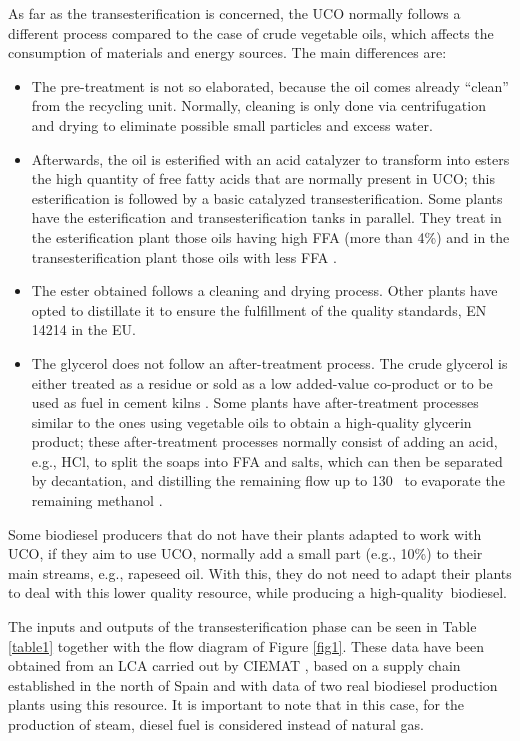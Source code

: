 \documentclass[sustainability,article,accept,moreauthors,pdftex,12pt,a4paper]{mdpi}
\newcommand{\degreeC}[1]{#1~\textcelsius}
\begin{document}
As far as the transesterification is concerned, the UCO normally follows a different process compared to the case of crude vegetable oils, which affects the consumption of materials and energy sources. The main differences are:
\begin{itemize}
\vspace{6pt}
\item The pre-treatment is not so elaborated, because the oil comes already ``clean'' from the recycling unit. Normally, cleaning is only done via centrifugation and drying to eliminate possible small particles and excess water.
\item Afterwards, the oil is esterified with an acid catalyzer to transform into esters the high quantity of free fatty acids that are normally present in UCO; this esterification is followed by a basic catalyzed transesterification. Some plants have the esterification and transesterification tanks in parallel. They treat in the esterification plant those oils having high FFA (more than 4\%) and in the transesterification plant those oils with less FFA \cite{CIEMAT2005}.
\item The ester obtained follows a cleaning and drying process. Other plants have opted to distillate it to ensure the fulfillment of the quality standards, EN 14214 \cite{CENEN14214} in the EU.
\item The glycerol does not follow an after-treatment process. The crude glycerol is either treated as a residue or sold as a low added-value co-product or to be used as fuel in cement kilns \cite{FontdeMoraThesis2013}. Some plants have after-treatment processes similar to the ones using vegetable oils to obtain a high-quality glycerin product; these after-treatment processes normally consist of adding an acid, e.g., HCl, to split the soaps into FFA and salts, which can then be separated by decantation, and distilling the remaining flow up to \degreeC{130} to evaporate the remaining methanol \cite{FontdeMoraThesis2013}.
\vspace{6pt}
\end{itemize}

Some biodiesel producers that do not have their plants adapted to work with UCO, if they aim to use UCO, normally add a small part (e.g., 10\%) to their main streams, e.g., rapeseed oil. With this, they do not need to adapt their plants to deal with this lower quality resource, while producing a high-quality~biodiesel.

The inputs and outputs of the transesterification phase can be seen in Table \ref{table1} together with the flow diagram of Figure \ref{fig1}. These data have been obtained from an LCA carried out by CIEMAT \cite{CIEMAT2005}, based on a supply chain established in the north of Spain and with data of two real biodiesel production plants using this resource. It is important to note that in this case, for the production of steam, diesel fuel is considered instead of natural gas.
\end{document}
